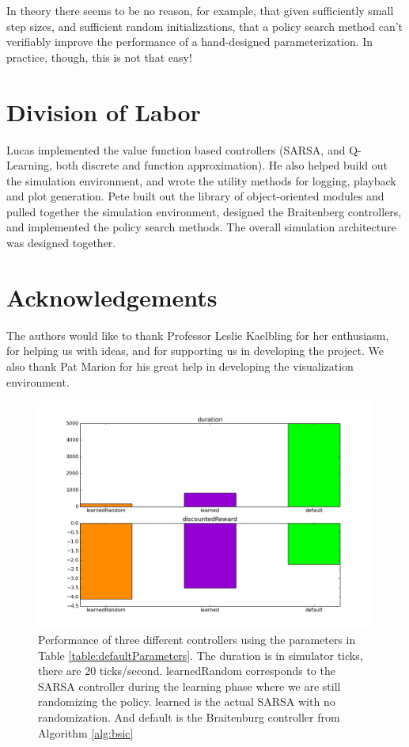 \documentclass{article}
\begin{document}
In theory there seems to be no reason, for example, that given sufficiently small step sizes, and sufficient random initializations, that a policy search method can't verifiably improve the performance of a hand-designed parameterization. In practice, though, this is not that easy!

\section{Division of Labor}

Lucas implemented the value function based controllers (SARSA, and Q-Learning, both discrete and function approximation). He also helped build out the simulation environment, and wrote the utility methods for logging, playback and plot generation. Pete built out the library of object-oriented modules and pulled together the simulation environment, designed the Braitenberg controllers, and implemented the policy search methods.  The overall simulation architecture was designed together.

\section{Acknowledgements}

The authors would like to thank Professor Leslie Kaelbling for her enthusiasm, for helping us with ideas, and for supporting us in developing the project.  We also thank Pat Marion for his great help in developing the visualization environment.


\begin{figure}
\centering
\includegraphics[scale=0.5]{figures/sarsaDiscrete_lam_0_7_6500_bar_all_controllers.png}
\caption{Performance of three different controllers using the parameters in Table \ref{table:defaultParameters}. The duration is in simulator ticks, there are 20 ticks/second. learnedRandom corresponds to the SARSA controller during the learning phase where we are still randomizing the policy. learned is the actual SARSA with no randomization. And default is the Braitenburg controller from Algorithm \ref{alg:bsic} }
\label{figures/sarsaDiscrete_lam_0_7_6500_bar_all_controllers.png}
\end{figure}
\end{document}
